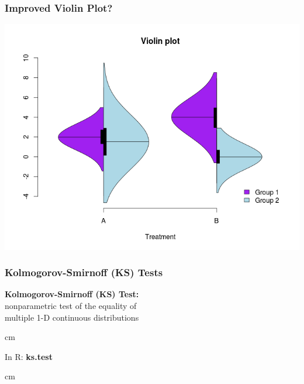 \documentclass{beamer} %
\begin{document}
\begin{frame}\frametitle{Improved Violin Plot?}
	\centering
	\includegraphics[width=\linewidth]{violin3.png}
\end{frame}




\begin{frame}\frametitle{Kolmogorov-Smirnoff (KS) Tests}
	\centering
	\textbf{Kolmogorov-Smirnoff (KS) Test:}  \\nonparametric test of the equality of\\ multiple 1-D continuous distributions
	
	 cm
	
	In R:  \textbf{ks.test}
	
	 cm
\end{frame}
\end{document}
